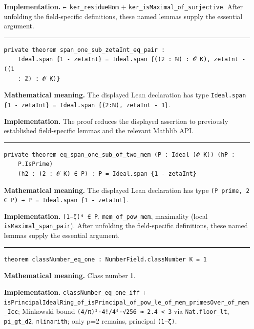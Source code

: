 \documentclass[UTF8,a4paper,11pt,fontset=fandol]{ctexart}
\theoremstyle{definition}
\newcommand{\statementsep}{\par\medskip\hrule\medskip}
\begin{document}
\noindent\textbf{Implementation.} \texttt{← ker\_\allowbreak{}residueHom} + \texttt{ker\_\allowbreak{}isMaximal\_\allowbreak{}of\_\allowbreak{}surjective}. After unfolding the field-specific definitions, these named lemmas supply the essential argument.\par
\statementsep
\begin{verbatim}
private theorem span_one_sub_zetaInt_eq_pair :
    Ideal.span {1 - zetaInt} = Ideal.span {((2 : ℕ) : 𝓞 K), zetaInt - ((1
    : ℤ) : 𝓞 K)}
\end{verbatim}
\noindent\textbf{Mathematical meaning.} The displayed Lean declaration has type \texttt{Ideal.\allowbreak{}span \{1 - zetaInt\} = Ideal.\allowbreak{}span \{(2:ℕ), zetaInt - 1\}}.\par
\noindent\textbf{Implementation.} The proof reduces the displayed assertion to previously established field-specific lemmas and the relevant Mathlib API.\par
\statementsep
\begin{verbatim}
private theorem eq_span_one_sub_of_two_mem (P : Ideal (𝓞 K)) (hP :
    P.IsPrime)
    (h2 : (2 : 𝓞 K) ∈ P) : P = Ideal.span {1 - zetaInt}
\end{verbatim}
\noindent\textbf{Mathematical meaning.} The displayed Lean declaration has type \texttt{(P prime, 2 ∈ P) → P = Ideal.\allowbreak{}span \{1 - zetaInt\}}.\par
\noindent\textbf{Implementation.} \texttt{(1−ζ)⁴ ∈ P}, \texttt{mem\_\allowbreak{}of\_\allowbreak{}pow\_\allowbreak{}mem}, maximality (local \texttt{isMaximal\_\allowbreak{}span\_\allowbreak{}pair}). After unfolding the field-specific definitions, these named lemmas supply the essential argument.\par
\statementsep
\begin{verbatim}
theorem classNumber_eq_one : NumberField.classNumber K = 1
\end{verbatim}
\noindent\textbf{Mathematical meaning.} Class number 1.\par
\noindent\textbf{Implementation.} \texttt{classNumber\_\allowbreak{}eq\_\allowbreak{}one\_\allowbreak{}iff} + \texttt{isPrincipalIdealRing\_\allowbreak{}of\_\allowbreak{}isPrincipal\_\allowbreak{}of\_\allowbreak{}pow\_\allowbreak{}le\_\allowbreak{}of\_\allowbreak{}mem\_\allowbreak{}primesOver\_\allowbreak{}of\_\allowbreak{}mem\_\allowbreak{}Icc}; Minkowski bound \texttt{(4/\allowbreak{}π)²·4!/\allowbreak{}4⁴·√256 ≈ 2.\allowbreak{}4 < 3} via \texttt{Nat.\allowbreak{}floor\_\allowbreak{}lt}, \texttt{pi\_\allowbreak{}gt\_\allowbreak{}d2}, \texttt{nlinarith}; only p=2 remains, principal \texttt{(1−ζ)}.\par
\end{document}

